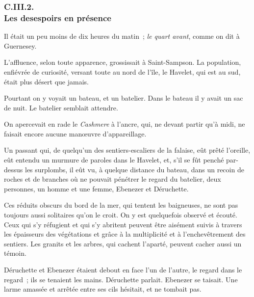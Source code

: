 \documentclass[french,twoside]{book} %
\begin{document}
 \subsubsection[{C.III.2. Les desespoirs en présence}]{C.III.2. \\
Les desespoirs en présence}
\noindent Il était un peu moins de dix heures du matin ; \emph{le quart avant}, comme on dit à Guernesey.\par
L’affluence, selon toute apparence, grossissait à Saint-Sampson. La population, enfiévrée de curiosité, versant toute au nord de l’île, le Havelet, qui est au sud, était plus désert que jamais.\par
Pourtant on y voyait un bateau, et un batelier. Dans le bateau il y avait un sac de nuit. Le batelier semblait attendre.\par
On apercevait en rade le \emph{Cashmere} à l’ancre, qui, ne devant partir qu’à midi, ne faisait encore aucune manœuvre d’appareillage.\par
Un passant qui, de quelqu’un des sentiers-escaliers de la falaise, eût prêté l’oreille, eût entendu un murmure de paroles dans le Havelet, et, s’il se fût penché par-dessus les surplombs, il eût vu, à quelque distance du bateau, dans un recoin de roches et de branches où ne pouvait pénétrer le regard du batelier, deux  personnes, un homme et une femme, Ebenezer et Déruchette.\par
Ces réduits obscurs du bord de la mer, qui tentent les baigneuses, ne sont pas toujours aussi solitaires qu’on le croit. On y est quelquefois observé et écouté. Ceux qui s’y réfugient et qui s’y abritent peuvent être aisément suivis à travers les épaisseurs des végétations et grâce à la multiplicité et à l’enchevêtrement des sentiers. Les granits et les arbres, qui cachent l’aparté, peuvent cacher aussi un témoin.\par
Déruchette et Ebenezer étaient debout en face l’un de l’autre, le regard dans le regard ; ils se tenaient les mains. Déruchette parlait. Ebenezer se taisait. Une larme amassée et arrêtée entre ses cils hésitait, et ne tombait pas.\par
\end{document}
